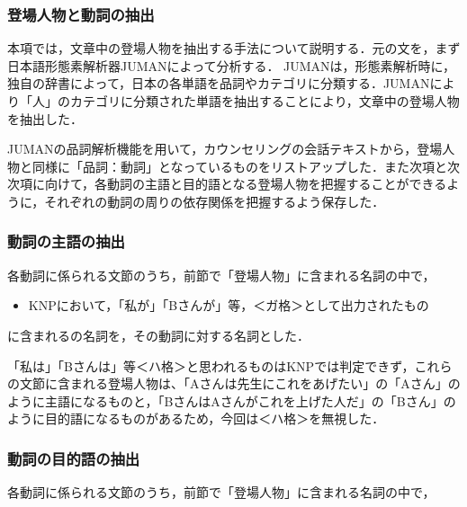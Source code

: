 \documentclass[shuuron]{kuee}
\begin{document}
\subsubsection{登場人物と動詞の抽出}


本項では，文章中の登場人物を抽出する手法について説明する．元の文を，まず日本語形態素解析器JUMAN\cite{juman}によって分析する． JUMANは，形態素解析時に，独自の辞書によって，日本の各単語を品詞やカテゴリに分類する．JUMANにより「人」のカテゴリに分類された単語を抽出することにより，文章中の登場人物を抽出した．%

JUMANの品詞解析機能を用いて，カウンセリングの会話テキストから，登場人物と同様に「品詞：動詞」となっているものをリストアップした．また次項と次次項に向けて，各動詞の主語と目的語となる登場人物を把握することができるように，それぞれの動詞の周りの依存関係を把握するよう保存した．



\subsubsection{動詞の主語の抽出}


各動詞に係られる文節のうち，前節で「登場人物」に含まれる名詞の中で，

\begin{itemize}

  \item KNPにおいて，「私が」「Bさんが」等，＜ガ格＞として出力されたもの
\end{itemize}
に含まれるの名詞を，その動詞に対する名詞とした．

「私は」「Bさんは」等＜ハ格＞と思われるものはKNPでは判定できず，これらの文節に含まれる登場人物は、「Aさんは先生にこれをあげたい」の「Aさん」のように主語になるものと，「BさんはAさんがこれを上げた人だ」の「Bさん」のように目的語になるものがあるため，今回は＜ハ格＞を無視した．

\subsubsection{動詞の目的語の抽出}


各動詞に係られる文節のうち，前節で「登場人物」に含まれる名詞の中で，
\end{document}
